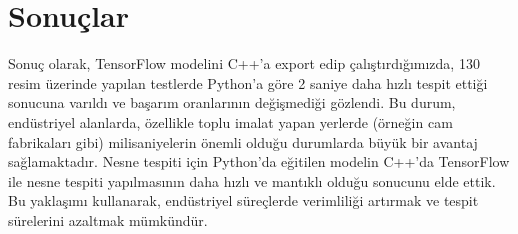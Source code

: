 \documentclass[12pt,a4paper]{article}
\begin{document}
			
	
	\clearpage
			
			\section{Sonuçlar}	
		


	
	
	\hspace{2em} Sonuç olarak, TensorFlow modelini C++'a export edip çalıştırdığımızda, 130 resim üzerinde yapılan testlerde Python'a göre 2 saniye daha hızlı tespit ettiği sonucuna varıldı ve başarım oranlarının değişmediği gözlendi. Bu durum, endüstriyel alanlarda, özellikle toplu imalat yapan yerlerde (örneğin cam fabrikaları gibi) milisaniyelerin önemli olduğu durumlarda büyük bir avantaj sağlamaktadır. Nesne tespiti için Python'da eğitilen modelin C++'da TensorFlow ile nesne tespiti yapılmasının daha hızlı ve mantıklı olduğu sonucunu elde ettik. Bu yaklaşımı kullanarak, endüstriyel süreçlerde verimliliği artırmak ve tespit sürelerini azaltmak mümkündür.\newline


		
		
	
	

	
	
	
	
\end{document}
